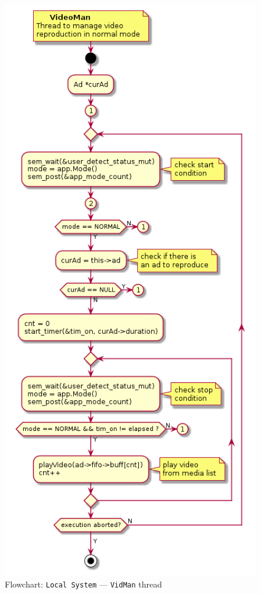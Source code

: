 \begin{figure}[htb!]
\centering
    \includegraphics[width=0.6\columnwidth]{./img/flow-local-video-man.png}
  \caption{Flowchart: \texttt{Local System} --- \texttt{VidMan} thread}%
\label{fig:flow-local-video-man}
\end{figure}
%
